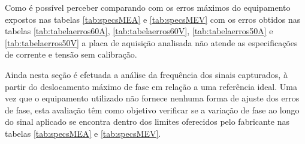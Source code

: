 \begin{table}[H]
\end{table}

Como é possível perceber comparando com os erros máximos do equipamento expostos nas tabelas \ref{tab:specsMEA} e \ref{tab:specsMEV} com os erros obtidos nas tabelas \ref{tab:tabelaerros60A}, \ref{tab:tabelaerros60V}, \ref{tab:tabelaerros50A} e \ref{tab:tabelaerros50V} a placa de aquisição analisada não atende as especificações de corrente e tensão sem calibração.

Ainda nesta seção é efetuada a análise da frequência dos sinais capturados, à partir do deslocamento máximo de fase em relação a uma referência ideal. Uma vez que o equipamento utilizado não fornece nenhuma forma de ajuste dos erros de fase, esta avaliação têm como objetivo verificar se a variação de fase ao longo do sinal aplicado se encontra dentro dos limites oferecidos pelo fabricante nas tabelas \ref{tab:specsMEA} e \ref{tab:specsMEV}.


